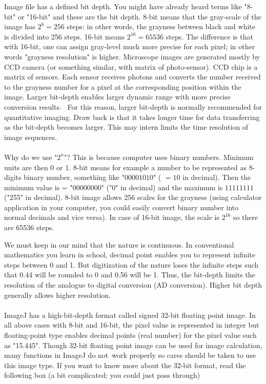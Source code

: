 Image file has a defined bit depth. You might have already
heard terms like "8-bit" or
"16-bit" and these are the bit depth. 8-bit
means that the gray-scale of the image has $2^{8} = 256$
steps: in other words, the grayness between black and white is divided
into 256 steps. 16-bit means $2^{16} = 65536$ steps. The
difference is that with 16-bit, one can assign gray-level much more
precise for each pixel; in other words "grayness
resolution" is higher. Microscope images are generated
mostly by CCD camera (or something similar, with matrix of
photo-sensor). CCD chip is a matrix of sensors. Each sensor receives
photons and converts the number received to the grayness number for a
pixel at the corresponding position within the image. Larger bit-depth
enables larger dynamic range with more precise conversion results.~ For
this reason, larger bit-depth is normally recommended for quantitative
imaging. Draw back is that it takes longer time for data transferring
as the bit-depth becomes larger. This may intern limits the time
resolution of image sequences. \\
~\\
Why do we use "$2^{n}$"? This
is because computer uses binary numbers. Minimum units are then 0 or 1.
8-bit means for example a number to be represented as 8-digits binary
number, something like "$00001010$" ( $= 10$ in
decimal). Then the minimum value is =
"$00000000$" ("0" in decimal) and the maximum is $11111111$
("255" in decimal). 8-bit image allows 256
scales for the grayness (using calculator application in your computer,
you could easily convert binary number into normal decimals and vice
versa). In case of 16-bit image, the scale is $2^{16}$ so
there are 65536 steps. 



We must keep in our mind that the nature is continuous. In conventional
mathematics you learn in school, decimal point enables you to represent
infinite steps between 0 and 1. But digitization of the nature loses
the infinite steps such that 0.44 will be rounded to 0 and 0.56 will be
1. Thus, the bit-depth limits the resolution of the analogue to digital
conversion (AD conversion). Higher bit depth generally allows higher
resolution.\\
\\
ImageJ has a high-bit-depth format called signed 32-bit floating point
image. In all above cases with 8-bit and 16-bit, the pixel value is
represented in integer but floating-point type enables decimal points
(real number) for the pixel value such as
"15.445". Though 32-bit floating point
image can be used for image calculation, many functions in ImageJ do
not~work properly so cares should be taken to use this image type. If
you want to know more about the 32-bit format, read the following box
(a bit complicated; you could just pass through)

